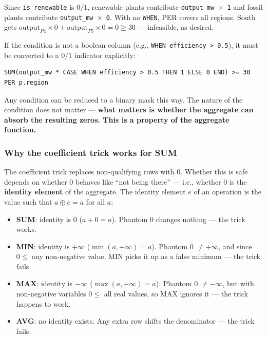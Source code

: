 \documentclass[11pt]{article}
\begin{document}
Since \texttt{is\_renewable} is $0/1$, renewable plants contribute
\texttt{output\_mw $\times$ 1} and fossil plants contribute
\texttt{output\_mw $\times$ 0}. With no \texttt{WHEN}, PER covers all
regions. South gets $\text{output}_{P4} \times 0 + \text{output}_{P5}
\times 0 = 0 \geq 30$ --- infeasible, as desired.

If the condition is not a boolean column (e.g., \texttt{WHEN efficiency > 0.5}),
it must be converted to a $0/1$ indicator explicitly:

\begin{lstlisting}
SUM(output_mw * CASE WHEN efficiency > 0.5 THEN 1 ELSE 0 END) >= 30 PER p.region
\end{lstlisting}

Any condition can be reduced to a binary mask this way. The nature of the
condition does not matter --- \textbf{what matters is whether the aggregate can absorb
the resulting zeros. This is a property of the aggregate function.}

\subsubsection*{Why the coefficient trick works for SUM}

The coefficient trick replaces non-qualifying rows with 0. Whether this
is safe depends on whether 0 behaves like ``not being there'' --- i.e.,
whether 0 is the \textbf{identity element} of the aggregate. The identity
element $e$ of an operation is the value such that $a \oplus e = a$ for
all $a$:

\begin{itemize}[leftmargin=2em]
    \item \textbf{SUM}: identity is $0$ ($a + 0 = a$). Phantom 0 changes
        nothing --- the trick works.
    \item \textbf{MIN}: identity is $+\infty$ ($\min(a, +\infty) = a$).
        Phantom 0 $\neq +\infty$, and since $0 \leq$ any non-negative value,
        MIN picks it up as a false minimum --- the trick fails.
    \item \textbf{MAX}: identity is $-\infty$ ($\max(a, -\infty) = a$).
        Phantom 0 $\neq -\infty$, but with non-negative variables $0 \leq$
        all real values, so MAX ignores it --- the trick happens to work.
    \item \textbf{AVG}: no identity exists. Any extra row shifts the
        denominator --- the trick fails.
\end{itemize}
\end{document}
